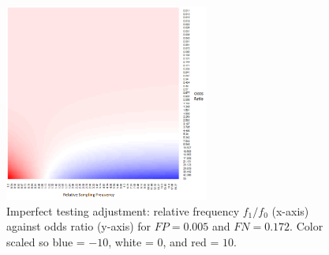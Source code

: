 \documentclass[12pt]{article}
\begin{document}



\clearpage

\begin{figure}[!th]
\centering
\includegraphics[width = 0.6\textwidth]{../methods/figs/mem_heatmap_article.png}
\caption{Imperfect testing adjustment: relative frequency $f_1/f_0$ (x-axis) against odds ratio (y-axis) for $FP=0.005$ and $FN=0.172$. Color scaled so blue = $-10$, white = $0$, and red = $10$.}
\label{fig:heatmap}
\end{figure}

\end{document}
